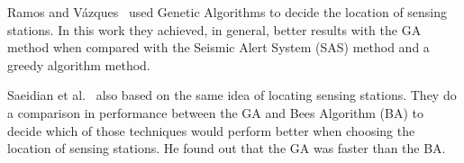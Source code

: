  
Ramos and Vázques~\cite{Ramos2011} used Genetic Algorithms to decide the location of sensing stations. In this work they achieved, in general, better results with the GA method when compared with the Seismic Alert System (SAS) method and a greedy algorithm method. %


Saeidian et al.~\cite{saeidian2016evaluation} also based on the same idea of locating sensing stations. They do a comparison in performance between the GA and Bees Algorithm (BA) to decide which of those techniques would perform better when choosing the location of sensing stations. He found out that the GA was faster than the BA.



